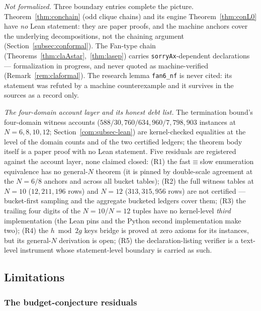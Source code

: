 \emph{Not formalized.} Three boundary entries complete the picture.
Theorem~\ref{thm:conchain} (odd clique chains) and its engine
Theorem~\ref{thm:conL0} have \emph{no} Lean statement: they are paper
proofs, and the machine anchors cover the underlying decompositions, not
the chaining argument (Section~\ref{subsec:conformal}). The Fan-type chain
(Theorems~\ref{thm:claAstar},~\ref{thm:lasep}) carries
\texttt{sorryAx}-dependent declarations --- formalization in progress, and
never quoted as machine-verified (Remark~\ref{rem:claformal}). The
research lemma \texttt{fan6\_nf} is never cited: its statement was
refuted by a machine counterexample and it survives in the sources as a
record only.

\emph{The four-domain account layer and its honest debt list.} The
termination bound's four-domain witness accounts
($588/30{,}760/634{,}960/7{,}798{,}903$ instances at $N=6,8,10,12$;
Section~\ref{com:subsec-lean}) are kernel-checked equalities at the level
of the domain counts and of the two certified ledgers; the theorem body
itself is a paper proof with no Lean statement. Five residuals are
registered against the account layer, none claimed closed:
(R1) the fast$\equiv$slow enumeration equivalence has no general-$N$
theorem (it is pinned by double-scale agreement at the $N=6/8$ anchors and
across all bucket tables); (R2) the full witness tables at $N=10$
($12{,}211{,}196$ rows) and $N=12$ ($313{,}315{,}956$ rows) are not
certified --- bucket-first sampling and the aggregate bucketed ledgers
cover them; (R3) the trailing four digits of the $N=10$/$N=12$ tuples have
no kernel-level \emph{third} implementation (the Lean pins and the Python
second implementation make two); (R4) the $h\bmod 2g$ keys bridge is
proved at zero axioms for its instances, but its general-$N$ derivation is
open; (R5) the declaration-listing verifier is a text-level instrument
whose statement-level boundary is carried as such.

\subsection{Limitations}\label{sta:subsec-limitations}

\subsubsection{The budget-conjecture residuals}\label{sta:subsubsec-kres}

